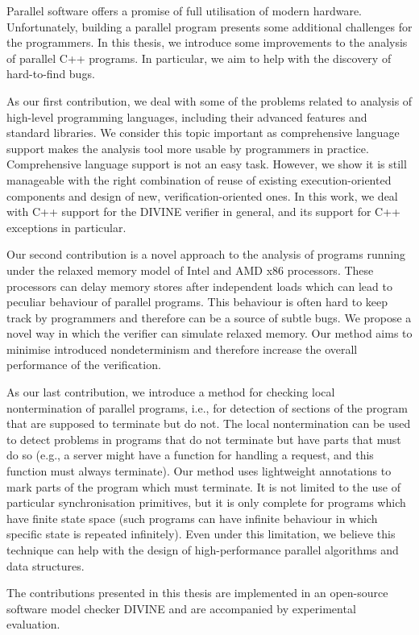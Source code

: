 Parallel software offers a promise of full utilisation of modern hardware.
Unfortunately, building a parallel program presents some additional challenges
for the programmers.
In this thesis, we introduce some improvements to the analysis of parallel
C++ programs.
In particular, we aim to help with the discovery of hard-to-find bugs.

As our first contribution, we deal with some of the problems related to
analysis of high-level programming languages, including their advanced features
and standard libraries.
We consider this topic important as comprehensive language support makes the
analysis tool more usable by programmers in practice.
Comprehensive language support is not an easy task.
However, we show it is still manageable with the right combination of reuse of
existing execution-oriented components and design of new, verification-oriented
ones.
In this work, we deal with C++ support for the DIVINE verifier in general, and
its support for C++ exceptions in particular.

Our second contribution is a novel approach to the analysis of programs running
under the relaxed memory model of Intel and AMD x86 processors.
These processors can delay memory stores after independent loads which can lead
to peculiar behaviour of parallel programs.
This behaviour is often hard to keep track by programmers and therefore can be
a source of subtle bugs.
We propose a novel way in which the verifier can simulate relaxed memory.
Our method aims to minimise introduced nondeterminism and therefore increase
the overall performance of the verification.

As our last contribution, we introduce a method for checking local
nontermination of parallel programs, i.e., for detection of sections of the
program that are supposed to terminate but do not.
The local nontermination can be used to detect problems in programs that do not
terminate but have parts that must do so (e.g., a server might have a
function for handling a request, and this function must always terminate).
Our method uses lightweight annotations to mark parts of the program which must
terminate.
It is not limited to the use of particular synchronisation primitives, but it
is only complete for programs which have finite state space (such programs can
have infinite behaviour in which specific state is repeated infinitely).
Even under this limitation, we believe this technique can help with the design
of high-performance parallel algorithms and data structures.

The contributions presented in this thesis are implemented in an open-source
software model checker DIVINE and are accompanied by experimental evaluation.

